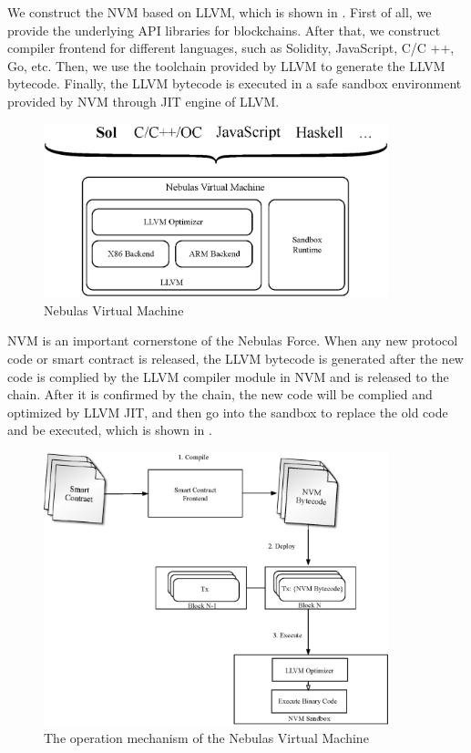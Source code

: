 We construct the NVM based on LLVM, which is shown in . First
of all, we provide the underlying API libraries for blockchains. After that, we
construct compiler frontend for different languages, such as Solidity,
JavaScript, C/C ++, Go, etc. Then, we use the toolchain provided by LLVM to
generate the LLVM bytecode. Finally, the LLVM bytecode is executed in a safe
sandbox environment provided by NVM through JIT engine of LLVM.


\begin{figure}[h]
\centering
\includegraphics[width=10cm]{./figs/nvm}
\caption{Nebulas Virtual Machine}
\label{fig:nvm}
\end{figure}

NVM is an important cornerstone of the Nebulas Force. When any new protocol
code or smart contract is released, the LLVM bytecode is generated after the
new code is complied by the LLVM compiler module in NVM and is released to the
chain. After it is confirmed by the chain, the new code will be complied and
optimized by LLVM JIT, and then go into the sandbox to replace the old code and
be executed, which is shown in .


\begin{figure}[h]
\centering
\includegraphics[width=10cm]{./figs/nvm-process}
\caption{The operation mechanism of the Nebulas Virtual Machine}
\label{fig:nvm-process}
\end{figure}

